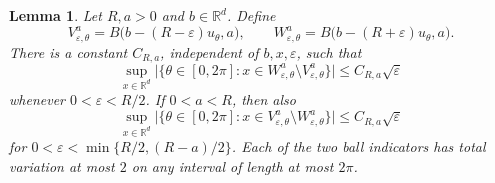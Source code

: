 \documentclass[10pt,a4paper]{amsart}
\newtheorem{lemma}{Lemma}[section]
\def\R{\mathbb{R}}
\newcommand\1{\mathbbm{1}}
\newcommand{\eps}{\varepsilon}
\begin{document}
\begin{lemma}\label{lem:geom-moving-balls}
Let $R,a>0$ and $b\in\R^d$. Define
\begin{equation}\label{eq:geom-component-windows}
    V_{\eps,\theta}^{a}=B\bigl(b-(R-\eps)u_\theta,a\bigr),
    \qquad
    W_{\eps,\theta}^{a}=B\bigl(b-(R+\eps)u_\theta,a\bigr).
\end{equation}
There is a constant $C_{R,a}$, independent of $b,x,\eps$, such that
\begin{equation}\label{eq:geom-outer-loss}
    \sup_{x\in\R^d}
    \bigl|\{\theta\in[0,2\pi]:
        x\in W_{\eps,\theta}^{a}\setminus V_{\eps,\theta}^{a}\}\bigr|
    \le C_{R,a}\sqrt{\eps}
\end{equation}
whenever $0<\eps<R/2$. If $0<a<R$, then also
\begin{equation}\label{eq:geom-inner-loss}
    \sup_{x\in\R^d}
    \bigl|\{\theta\in[0,2\pi]:
        x\in V_{\eps,\theta}^{a}\setminus W_{\eps,\theta}^{a}\}\bigr|
    \le C_{R,a}\sqrt{\eps}
\end{equation}
for $0<\eps<\min\{R/2,(R-a)/2\}$. Each of the two ball indicators has total
variation at most $2$ on any interval of length at most $2\pi$.
\end{lemma}
\end{document}
